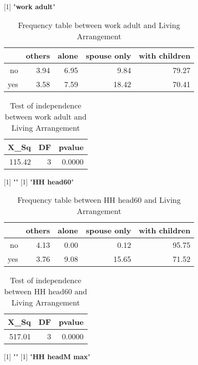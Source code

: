 \documentclass[11pt]{article}
\begin{document}
[1] "{\bf{work adult}}"
\begin{table}[H]
\centering
\begin{tabular}{rrrrr}
  \hline
 & others & alone & spouse only & with children \\ 
  \hline
no & 3.94 & 6.95 & 9.84 & 79.27 \\ 
  yes & 3.58 & 7.59 & 18.42 & 70.41 \\ 
   \hline
\end{tabular}
\caption{Frequency table between work adult and Living Arrangement} 
\end{table}
\begin{table}[H]
\centering
\begin{tabular}{rrr}
  \hline
X\_Sq & DF & pvalue \\ 
  \hline
115.42 & 3 & 0.0000 \\ 
   \hline
\end{tabular}
\caption{Test of independence between work adult and Living Arrangement} 
\end{table}
[1] "\newline"
[1] "{\bf{HH head60}}"
\begin{table}[H]
\centering
\begin{tabular}{rrrrr}
  \hline
 & others & alone & spouse only & with children \\ 
  \hline
no & 4.13 & 0.00 & 0.12 & 95.75 \\ 
  yes & 3.76 & 9.08 & 15.65 & 71.52 \\ 
   \hline
\end{tabular}
\caption{Frequency table between HH head60 and Living Arrangement} 
\end{table}
\begin{table}[H]
\centering
\begin{tabular}{rrr}
  \hline
X\_Sq & DF & pvalue \\ 
  \hline
517.01 & 3 & 0.0000 \\ 
   \hline
\end{tabular}
\caption{Test of independence between HH head60 and Living Arrangement} 
\end{table}
[1] "\newline"
[1] "{\bf{HH headM max}}"
\end{document}
